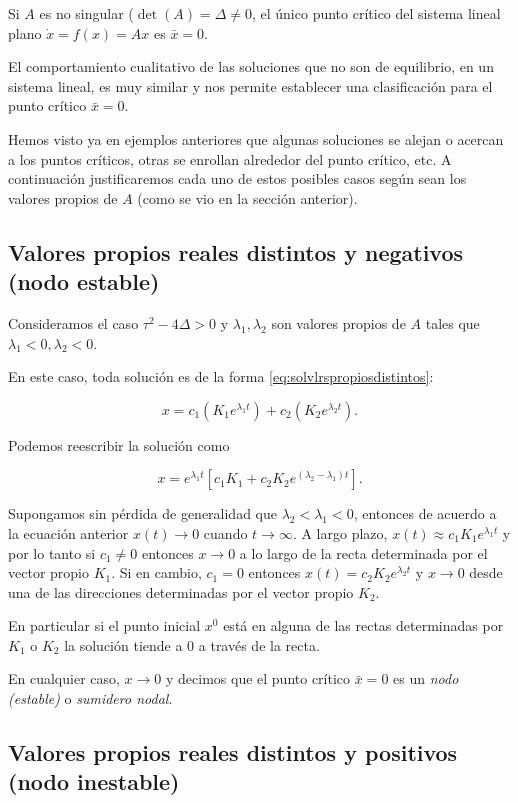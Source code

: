 \documentclass[11pt]{book}
\theoremstyle{definition}
\numberwithin{definition}{section}
\theoremstyle{theorem}
\numberwithin{theorem}{section}
\numberwithin{lemma}{section}
\numberwithin{corollary}{section}
\theoremstyle{plain}
\numberwithin{example}{section}
\begin{document}
Si $A$ es no singular ($\det(A) = \Delta \neq 0$, el único punto crítico del sistema lineal plano $\dot{x} = f(x) = Ax$ es $\bar{x} = 0$.

El comportamiento cualitativo de las soluciones que no son de equilibrio, en un sistema lineal, es muy similar y nos permite establecer una clasificación para el punto crítico $\bar{x} = 0$.

Hemos visto ya en ejemplos anteriores que algunas soluciones se alejan o acercan a los puntos críticos, otras se enrollan alrededor del punto crítico, etc. A continuación justificaremos cada uno de estos posibles casos según sean los valores propios de $A$ (como se vio en la sección anterior).

\subsection{Valores propios reales distintos y negativos (nodo estable)}
Consideramos el caso $\tau^2 - 4\Delta > 0$ y $\lambda_1, \lambda_2$ son valores propios de $A$ tales que $\lambda_1 < 0, \lambda_2 < 0$.

En este caso, toda solución es de la forma \ref{eq:solvlrspropiosdistintos}:

$$ x = c_1(K_1 e^{\lambda_1 t}) + c_2(K_2 e^{\lambda_2 t}). $$

Podemos reescribir la solución como

$$ x = e^{\lambda_1 t} [ c_1 K_1 + c_2K_2 e^{(\lambda_2 - \lambda_1)t} ].$$

Supongamos sin pérdida de generalidad que $\lambda_2 < \lambda_1 < 0$, entonces de acuerdo a la ecuación anterior $x(t) \to 0$ cuando $t \to \infty$.
A largo plazo, $x(t) \approx c_1K_1e^{\lambda_1 t}$ y por lo tanto si $c_1 \neq 0$ entonces $x \to 0$ a lo largo de la recta determinada por el vector propio $K_1$.
Si en cambio, $c_1 = 0$ entonces $x(t) = c_2 K_2 e^{\lambda_2 t}$ y $x \to 0$ desde una de las direcciones determinadas por el vector propio $K_2$.

En particular si el punto inicial $x^0$ está en alguna de las rectas determinadas por $K_1$ o $K_2$ la solución tiende a 0 a través de la recta.

En cualquier caso, $x \to 0$ y decimos que el punto crítico $\bar{x} = 0$ es un \emph{nodo (estable)} o \emph{sumidero nodal}.

\subsection{Valores propios reales distintos y positivos (nodo inestable)}
\end{document}
